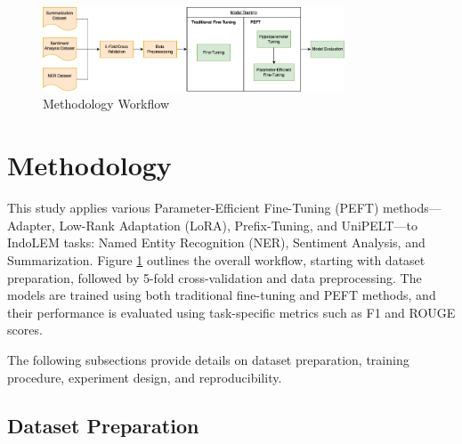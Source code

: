 \begin{figure}[h]
    \vspace{0.25cm}
    \centering
    \includegraphics[width=0.8\textwidth]{resources/paper_solution.png}
    \caption{Methodology Workflow}
    \label{methodology}
\end{figure}

\section{Methodology}

This study applies various Parameter-Efficient Fine-Tuning (PEFT) methods—Adapter, Low-Rank Adaptation (LoRA), Prefix-Tuning, and UniPELT—to IndoLEM tasks: Named Entity Recognition (NER), Sentiment Analysis, and Summarization. Figure \ref{methodology} outlines the overall workflow, starting with dataset preparation, followed by 5-fold cross-validation and data preprocessing. The models are trained using both traditional fine-tuning and PEFT methods, and their performance is evaluated using task-specific metrics such as F1 and ROUGE scores. 

The following subsections provide details on dataset preparation, training procedure, experiment design, and reproducibility.

\subsection{Dataset Preparation}

\begin{table}[htbp]
    \vspace{0.25cm}
    \centering
    \caption{Dataset Details}
    \label{table:dataset-indolem}
\end{table}


